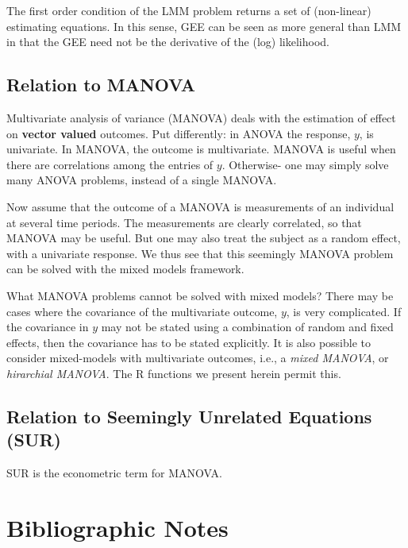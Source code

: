 \documentclass[]{book}
\theoremstyle{definition}
\theoremstyle{definition}
\theoremstyle{definition}
\theoremstyle{remark}
\begin{document}
The first order condition of the LMM problem returns a set of (non-linear) estimating equations.
In this sense, GEE can be seen as more general than LMM in that the GEE need not be the derivative of the (log) likelihood.

\hypertarget{manova}{%
\subsection{Relation to MANOVA}\label{manova}}

Multivariate analysis of variance (MANOVA) deals with the estimation of effect on \textbf{vector valued} outcomes.
Put differently: in ANOVA the response, \(y\), is univariate.
In MANOVA, the outcome is multivariate.
MANOVA is useful when there are correlations among the entries of \(y\).
Otherwise- one may simply solve many ANOVA problems, instead of a single MANOVA.

Now assume that the outcome of a MANOVA is measurements of an individual at several time periods.
The measurements are clearly correlated, so that MANOVA may be useful.
But one may also treat the subject as a random effect, with a univariate response.
We thus see that this seemingly MANOVA problem can be solved with the mixed models framework.

What MANOVA problems cannot be solved with mixed models?
There may be cases where the covariance of the multivariate outcome, \(y\), is very complicated.
If the covariance in \(y\) may not be stated using a combination of random and fixed effects, then the covariance has to be stated explicitly.
It is also possible to consider mixed-models with multivariate outcomes, i.e., a \emph{mixed MANOVA}, or \emph{hirarchial MANOVA}.
The R functions we present herein permit this.

\hypertarget{relation-to-seemingly-unrelated-equations-sur}{%
\subsection{Relation to Seemingly Unrelated Equations (SUR)}\label{relation-to-seemingly-unrelated-equations-sur}}

SUR is the econometric term for MANOVA.

\hypertarget{bibliographic-notes-6}{%
\section{Bibliographic Notes}\label{bibliographic-notes-6}}
\end{document}
